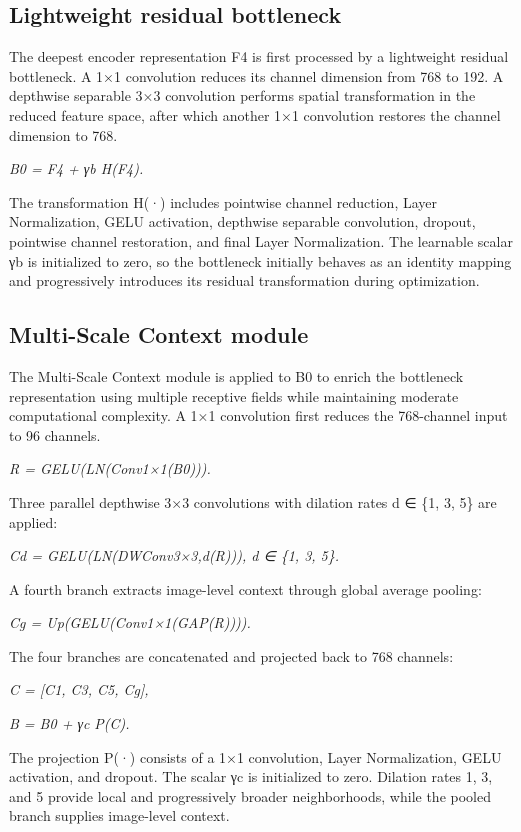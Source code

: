 \subsection{\texorpdfstring{ Lightweight residual
bottleneck}{ Lightweight residual bottleneck}}\label{lightweight-residual-bottleneck}

The deepest encoder representation F4 is first processed by a
lightweight residual bottleneck. A 1×1 convolution reduces its channel
dimension from 768 to 192. A depthwise separable 3×3 convolution
performs spatial transformation in the reduced feature space, after
which another 1×1 convolution restores the channel dimension to 768.

\emph{B0 = F4 + γb H(F4).}

The transformation H(·) includes pointwise channel reduction, Layer
Normalization, GELU activation, depthwise separable convolution,
dropout, pointwise channel restoration, and final Layer Normalization.
The learnable scalar γb is initialized to zero, so the bottleneck
initially behaves as an identity mapping and progressively introduces
its residual transformation during optimization.

\subsection{\texorpdfstring{ Multi-Scale Context
module}{ Multi-Scale Context module}}\label{multi-scale-context-module}

The Multi-Scale Context module is applied to B0 to enrich the bottleneck
representation using multiple receptive fields while maintaining
moderate computational complexity. A 1×1 convolution first reduces the
768-channel input to 96 channels.

\emph{R = GELU(LN(Conv1×1(B0))).}

Three parallel depthwise 3×3 convolutions with dilation rates d ∈ \{1,
3, 5\} are applied:

\emph{Cd = GELU(LN(DWConv3×3,d(R))), d ∈ \{1, 3, 5\}.}

A fourth branch extracts image-level context through global average
pooling:

\emph{Cg = Up(GELU(Conv1×1(GAP(R)))).}

The four branches are concatenated and projected back to 768 channels:

\emph{C = {[}C1, C3, C5, Cg{]},}

\emph{B = B0 + γc P(C).}

The projection P(·) consists of a 1×1 convolution, Layer Normalization,
GELU activation, and dropout. The scalar γc is initialized to zero.
Dilation rates 1, 3, and 5 provide local and progressively broader
neighborhoods, while the pooled branch supplies image-level context.

